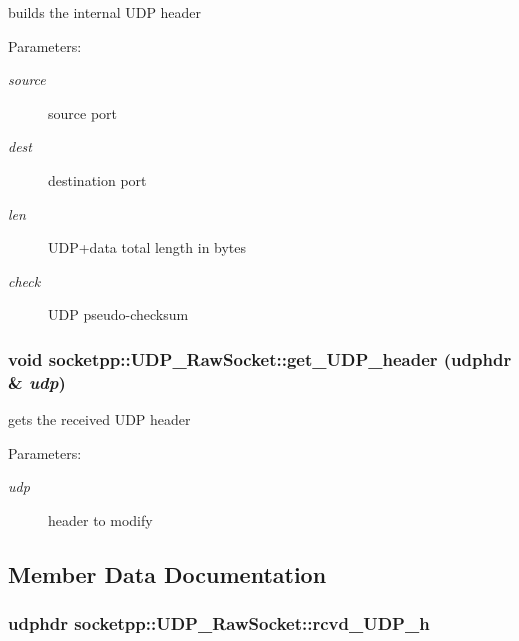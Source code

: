 builds the internal UDP header 

\begin{Desc}
\item[Parameters:]
\begin{description}
\item[{\em source}]source port \item[{\em dest}]destination port \item[{\em len}]UDP+data total length in bytes \item[{\em check}]UDP pseudo-checksum \end{description}
\end{Desc}
\hypertarget{classsocketpp_1_1UDP__RawSocket_597a30fc537dce06c85663add29defdc}{
\subsubsection[{get\_\-UDP\_\-header}]{\setlength{\rightskip}{0pt plus 5cm}void socketpp::UDP\_\-RawSocket::get\_\-UDP\_\-header (udphdr \& {\em udp})}}
\label{classsocketpp_1_1UDP__RawSocket_597a30fc537dce06c85663add29defdc}


gets the received UDP header 

\begin{Desc}
\item[Parameters:]
\begin{description}
\item[{\em udp}]header to modify \end{description}
\end{Desc}


\subsection{Member Data Documentation}
\hypertarget{classsocketpp_1_1UDP__RawSocket_9b21e1b520434f7b07d5afcc35ceb76c}{
\subsubsection[{rcvd\_\-UDP\_\-h}]{\setlength{\rightskip}{0pt plus 5cm}udphdr {\bf socketpp::UDP\_\-RawSocket::rcvd\_\-UDP\_\-h}}}
\label{classsocketpp_1_1UDP__RawSocket_9b21e1b520434f7b07d5afcc35ceb76c}


